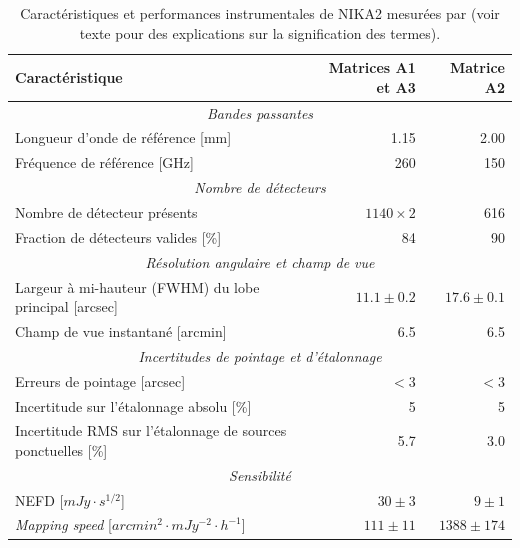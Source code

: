 \begin{table}[t]
    \setlength{\tabcolsep}{15pt}
    \small
    \centering
    \begin{tabular}{l r r}
        \toprule
        Caractéristique & Matrices A1 et A3 & Matrice A2 \\
        \midrule
        \midrule
        \multicolumn{3}{c}{\itshape Bandes passantes} \\
        \midrule
        Longueur d'onde de référence [mm]   & 1.15 & 2.00 \\
        Fréquence de référence [GHz]        & 260  & 150  \\
        \midrule
        \multicolumn{3}{c}{\itshape Nombre de détecteurs} \\
        \midrule
        Nombre de détecteur présents        & $1140 \times 2$ & 616 \\
        Fraction de détecteurs valides [\%] & 84 & 90 \\
        \midrule
        \multicolumn{3}{c}{\itshape Résolution angulaire et champ de vue} \\
        \midrule
        Largeur à mi-hauteur (FWHM) du lobe principal [arcsec] & $11.1 \pm 0.2$ & $17.6 \pm 0.1$ \\
        Champ de vue instantané [arcmin]    & 6.5 & 6.5 \\
        \midrule
        \multicolumn{3}{c}{\itshape Incertitudes de pointage et d'étalonnage} \\
        \midrule
        Erreurs de pointage [arcsec] & $<3$ & $<3$ \\
        Incertitude sur l'étalonnage absolu [\%] & 5 & 5 \\
        Incertitude RMS sur l'étalonnage de sources ponctuelles [\%] & 5.7 & 3.0 \\
        \midrule
        \multicolumn{3}{c}{\itshape Sensibilité} \\
        \midrule
        NEFD [$\unit{mJy \cdot s^{1/2}}$]  & $30 \pm 3$ & $9 \pm 1$ \\
        \textit{Mapping speed} [$\unit{arcmin^2 \cdot mJy^{-2} \cdot h^{-1}}$] & $111 \pm 11$ & $1388 \pm 174$ \\
        \bottomrule
    \end{tabular}
    \caption{%
        Caractéristiques et performances instrumentales de NIKA2 mesurées par  (voir texte pour des explications sur la signification des termes).
    }
    \label{tab:nk_specs}
\end{table}

